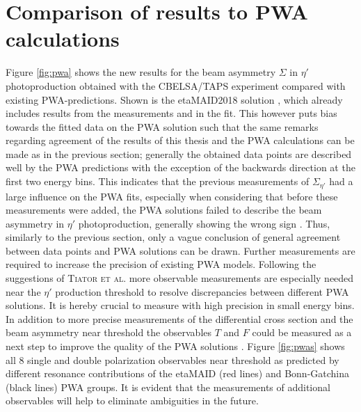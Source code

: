 \section{Comparison of results to PWA calculations}
Figure \ref{fig:pwa} shows the new results for the beam asymmetry $\Sigma$ in $\eta'$ photoproduction obtained with the CBELSA/TAPS experiment compared with existing PWA-predictions. Shown is the etaMAID2018 solution \cite{etaMAID}, which already includes results from the measurements \cite{collins} and \cite{thresh} in the fit. This however puts bias towards  the fitted data on the PWA solution such that the same remarks regarding agreement of the results of this thesis and the PWA calculations can be made as in the previous section; generally the obtained data points are described well by the PWA predictions with the exception of the backwards direction at the first two energy bins. This indicates that the previous measurements of $\Sigma_{\eta'}$ had a large influence on the PWA fits, especially when considering that before these measurements were added, the PWA solutions failed to describe the beam asymmetry in $\eta'$ photoproduction, generally showing the wrong sign \cite{collins}. Thus, similarly to the previous section, only a vague conclusion of general agreement between data points and PWA solutions can be drawn. Further measurements are required to increase the precision of existing PWA models. Following the suggestions of \textsc{Tiator et al.} \cite{etaMAID} more observable measurements are especially needed near the $\eta'$ production threshold to resolve discrepancies between different PWA solutions. It is hereby crucial to measure with high precision in small energy bins. In addition to more precise measurements of the differential cross section and the beam asymmetry near threshold the observables $T$ and $F$ could be measured as a next step to improve the quality of the PWA solutions \cite{etaMAID}. Figure \ref{fig:pwas} shows all 8 single and double polarization observables near threshold as predicted by different resonance contributions of the etaMAID \cite{etaMAID} (red lines) and Bonn-Gatchina \cite{etap_bnga} (black lines) PWA groups. It is evident that the measurements of additional observables will help to eliminate ambiguities in the future.
